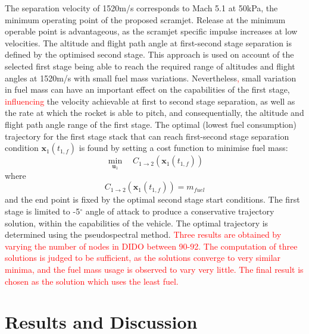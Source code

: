 \documentclass[journal]{new-aiaa}
\begin{document}
The separation velocity of 1520m/s corresponds to Mach 5.1 at 50kPa, the minimum operating point of the proposed scramjet\cite{Preller2017b}. Release at the minimum operable point is advantageous, as the scramjet specific impulse increases at low velocities\cite{Preller2017b}.
The altitude and flight path angle at first-second stage separation is defined by the optimised second stage. This approach is used on account of the selected first stage being able to reach the required range of altitudes and flight angles at 1520m/s  with small fuel mass variations. 
Nevertheless\textcolor{red}{,} small variation in fuel mass can have an important effect on the capabilities of the first stage, \textcolor{red}{influencing} the velocity achievable at first to second stage separation, as well as the rate at which the rocket is able to pitch, and consequentially, the altitude and flight path angle range of the first stage.
 The optimal (lowest fuel consumption) trajectory for the first stage stack that can reach first-second stage separation condition $\textbf{x}_1(t_{1,f})$ is found by setting a cost function to minimise fuel mass:
\begin{equation}
\min\limits_{\textbf{u}_1} \quad  C_{1 \rightarrow 2}(\textbf{x}_1(t_{1,f}))
\end{equation}
where
\begin{equation}
C_{1 \rightarrow 2}(\textbf{x}_1(t_{1,f})) = m_{fuel}
\end{equation}
and the end point is fixed by the optimal second stage start conditions. The first stage is limited to -5$^\circ$ angle of attack to produce a conservative trajectory solution, within the capabilities of the vehicle. The optimal trajectory is determined using the pseudospectral method. \textcolor{red}{Three results are obtained by varying the number of nodes in DIDO between 90-92. The computation of three solutions is judged to be sufficient, as the solutions converge to very similar minima, and the fuel mass usage is observed to vary very little. The final result is chosen as the solution which uses the least fuel.}


\section{Results and Discussion} \label{section:results}
\end{document}
